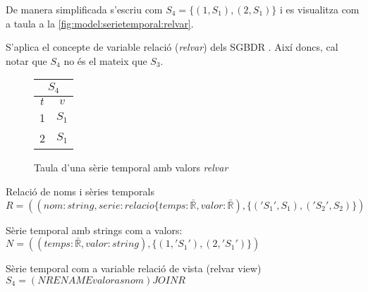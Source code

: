 De manera simplificada s'escriu com
$S_4 =  \{ (1,S_1) , (2,S_1) \}$ 
i es visualitza com a taula a la \autoref{fig:model:serietemporal:relvar}.

S'aplica el concepte de variable relació (\emph{relvar}) dels SGBDR \parencite[sec.\ 3.3]{date:introduction}.
Així doncs, cal notar que $S_4$  no és el mateix que $S_3$.
\begin{figure}[tp]
  \centering
  \begin{tabular}{|c|c|}
    \multicolumn{2}{c}{$S_4$} \\ \hline
    $t$  & $v$ \\ \hline
    1 & $S_1$ \\
    2 & $S_1$ \\ \hline
  \end{tabular}
  \caption{Taula d'una sèrie temporal amb valors \emph{relvar}}
  \label{fig:model:serietemporal:relvar}
\end{figure}


Relació de noms i sèries temporals $R =  ((nom:string,serie:relacio\{temps:\bar{\mathbb{R}},valor:\bar{\mathbb{R}}),\{ ('S_1',S_1),('S_2',S_2)  \})$

Sèrie temporal amb strings com a valors:
$N= ( (temps:\bar{\mathbb{R}},valor:string) ,\{ (1,'S_1') , (2,'S_1') \})$

Sèrie temporal com a variable relació de vista (relvar view)
$S_4 =  (N RENAME valor as nom) JOIN R$




















